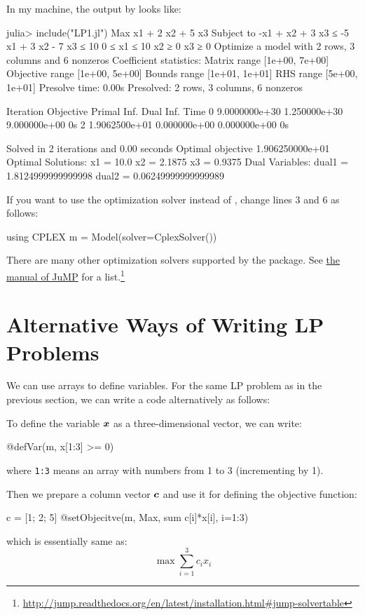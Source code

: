 In my machine, the output by \gurobi{} looks like:
\begin{code}
julia> include("LP1.jl")
Max x1 + 2 x2 + 5 x3
Subject to
 -x1 + x2 + 3 x3 ≤ -5
 x1 + 3 x2 - 7 x3 ≤ 10
 0 ≤ x1 ≤ 10
 x2 ≥ 0
 x3 ≥ 0
Optimize a model with 2 rows, 3 columns and 6 nonzeros
Coefficient statistics:
  Matrix range    [1e+00, 7e+00]
  Objective range [1e+00, 5e+00]
  Bounds range    [1e+01, 1e+01]
  RHS range       [5e+00, 1e+01]
Presolve time: 0.00s
Presolved: 2 rows, 3 columns, 6 nonzeros

Iteration    Objective       Primal Inf.    Dual Inf.      Time
       0    9.0000000e+30   1.250000e+30   9.000000e+00      0s
       2    1.9062500e+01   0.000000e+00   0.000000e+00      0s

Solved in 2 iterations and 0.00 seconds
Optimal objective  1.906250000e+01
Optimal Solutions:
x1 = 10.0
x2 = 2.1875
x3 = 0.9375
Dual Variables:
dual1 = 1.8124999999999998
dual2 = 0.06249999999999989
\end{code}
\noindent If you want to use the \cplex{} optimization solver instead of \gurobi{}, change lines 3 and 6 as follows:
\begin{code}
using CPLEX
m = Model(solver=CplexSolver())
\end{code}
\noindent There are many other optimization solvers supported by the \jump{} package. See \href{http://jump.readthedocs.org/en/latest/installation.html#jump-solvertable}{the manual of JuMP} for a list.\footnote{\url{http://jump.readthedocs.org/en/latest/installation.html#jump-solvertable}}

\section{Alternative Ways of Writing LP Problems}

We can use arrays to define variables. For the same LP problem as in the previous section, we can write a \julia{} code alternatively as follows:



To define the variable $\boldsymbol{x}$ as a three-dimensional vector, we can write:
\begin{code}
@defVar(m, x[1:3] >= 0)
\end{code}
\noindent where \texttt{1:3} means an array with numbers from 1 to 3 (incrementing by 1).

Then we prepare a column vector $\boldsymbol{c}$ and use it for defining the objective function:
\begin{code}
c = [1; 2; 5]
@setObjecitve(m, Max, sum{ c[i]*x[i], i=1:3})
\end{code}
\noindent which is essentially same as:
\[
	\max \sum_{i=1}^3 c_i x_i
\]

